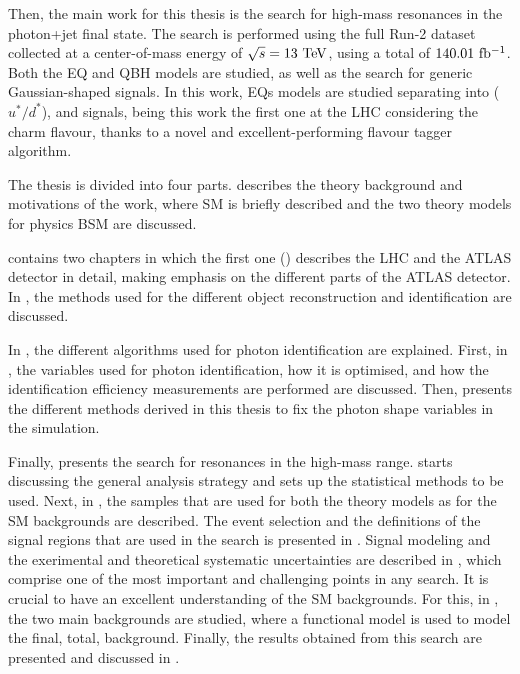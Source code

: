 Then, the main work for this thesis is the search for high-mass resonances in the photon+jet final state. The search is performed using the full Run-2 dataset collected at a center-of-mass energy of \(\sqs=13~\tev\), using a total of \(140.01~\ifb\). Both the \ac{EQ} and \ac{QBH} models are studied, as well as the search for generic Gaussian-shaped signals.
In this work, \acp{EQ} models are studied separating into \qstar (\(u^*/d^*\)), \cstar and \bstar signals, being this work the first one at the \ac{LHC} considering the charm flavour, thanks to a novel and excellent-performing flavour tagger algorithm.




The thesis is divided into four parts. 
\Part{\ref{part:theory}} describes the theory background and motivations of the work, where \ac{SM} is briefly described and the two theory models for physics \ac{BSM} are discussed.

\Part{\ref{part:exp_setup}} contains two chapters in which the first one (\Ch{\ref{ch:atlas}}) describes the \ac{LHC} and the \ac{ATLAS} detector in detail, making emphasis on the different parts of the \ac{ATLAS} detector. In \Ch{\ref{ch:objects}}, the methods used for the different object reconstruction and identification are discussed.

In \Part{\ref{part:pid}}, the different algorithms used for photon identification are explained. First, in \Ch{\ref{ch:pid_ss}}, the variables used for photon identification, how it is optimised, and how the identification efficiency measurements are performed are discussed. Then, \Ch{\ref{ch:ss_corrections}} presents the different methods derived in this thesis to fix the photon shape variables in the simulation.

Finally, \Part{\ref{part:search}} presents the search for \gammajet resonances in the high-mass range. \Ch{\ref{ch:strategy}} starts discussing the general analysis strategy and sets up the statistical methods to be used. Next, in \Ch{\ref{ch:samples}}, the samples that are used for both the theory models as for the \ac{SM} backgrounds are described. The event selection and the definitions of the signal regions that are used in the search is presented in \Ch{\ref{ch:evt_selection}}. Signal modeling and the exerimental and theoretical systematic uncertainties are described in \Ch{\ref{ch:signals}}, which comprise one of the most important and challenging points in any search. It is crucial to have an excellent understanding of the \ac{SM} backgrounds. For this, in \Ch{\ref{ch:bkg}}, the two main backgrounds are studied, where a functional model is used to model the final, total, background. Finally, the results obtained from this search are presented and discussed in \Ch{\ref{ch:results}}.


